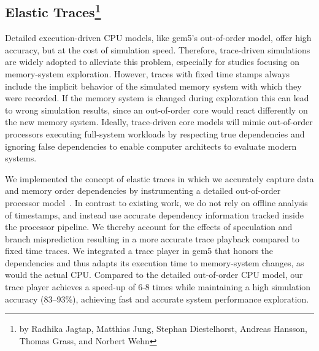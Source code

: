 \subsection[Elastic Traces]{Elastic Traces\footnote{by Radhika Jagtap, Matthias Jung, Stephan Diestelhorst, Andreas Hansson, Thomas Grass, and Norbert Wehn}}
\label{sec:elastic}

Detailed execution-driven CPU models, like gem5's out-of-order model, offer high accuracy, but at the cost of simulation speed.
Therefore, trace-driven simulations are widely adopted to alleviate this problem, especially for studies focusing on memory-system exploration.
However, traces with fixed time stamps always include the implicit behavior of the simulated memory system with which they were recorded.
If the memory system is changed during exploration this can lead to wrong simulation results, since an out-of-order core would react differently on the new memory system.
Ideally, trace-driven core models will mimic out-of-order processors executing full-system workloads by respecting true dependencies and ignoring false dependencies to enable computer architects to evaluate modern systems.

We implemented the concept of elastic traces in which we accurately capture data and memory order dependencies by instrumenting a detailed out-of-order processor model~\cite{jagdie_16}.
In contrast to existing work, we do not rely on offline analysis of timestamps, and instead use accurate dependency information tracked inside the processor pipeline.
We thereby account for the effects of speculation and branch misprediction resulting in a more accurate trace playback compared to fixed time traces.
We integrated a trace player in gem5 that honors the dependencies and thus adapts its execution time to memory-system changes, as would the actual CPU.
Compared to the detailed out-of-order CPU model, our trace player achieves a speed-up of 6-8 times while maintaining a high simulation accuracy (83--93\%), achieving fast and accurate system performance exploration.
